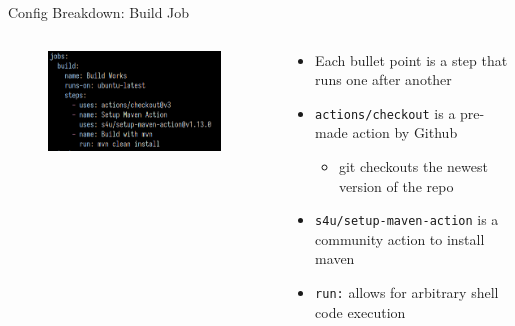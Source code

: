 \documentclass[compress,aspectratio=169]{beamer}
\begin{document}
	\begin{frame}{Config Breakdown: Build Job}
    \begin{columns}
      \begin{column}{0.5\textwidth}
        \begin{figure}
          \begin{center}
            \includegraphics[width=0.95\textwidth]{build.png}
          \end{center}
        \end{figure}
      \end{column}
      \begin{column}{0.5\textwidth}
        \begin{itemize}
          \item Each bullet point is a step that runs one after another
          \item \texttt{actions/checkout} is a pre-made action by Github
            \begin{itemize}
              \item git checkouts the newest version of the repo
            \end{itemize}
          \item \texttt{s4u/setup-maven-action} is a community action to install maven
          \item \texttt{run:} allows for arbitrary shell code execution
        \end{itemize}
      \end{column}
    \end{columns}
	\end{frame}
\end{document}

